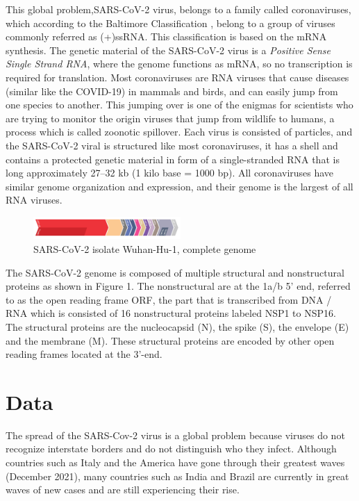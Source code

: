 \documentclass[conference,compsoc]{IEEEtran}
\begin{document}
This global problem,SARS-CoV-2 virus, belongs to a family called coronaviruses, which according to the Baltimore Classification \cite{ref5}, belong to a group of viruses commonly referred as (+)ssRNA. This classification is based on the mRNA synthesis. The genetic material of the SARS-CoV-2 virus is a \textit{Positive Sense Single Strand RNA}, where the genome functions as mRNA, so no transcription is required for translation. Most coronaviruses are RNA viruses that cause diseases (similar like the COVID-19) in mammals and birds, and can easily jump from one species to another. This jumping over is one of the enigmas for scientists who are trying to monitor the origin viruses that jump from wildlife to humans, a process which is called zoonotic spillover. \cite{ref6}
Each virus is consisted of particles, and the SARS-CoV-2 viral is structured like most coronaviruses, it has a shell and contains a protected genetic material in form of a  single-stranded RNA that is long approximately 27–32 kb (1 kilo base = 1000 bp). All coronaviruses have similar genome organization and expression, and their genome is the largest of all RNA viruses.

\begin{figure}[h]
    \centering
    \includegraphics[width=0.5\textwidth]{images/fig1-s_gene.jpg}
    \caption{SARS-CoV-2 isolate Wuhan-Hu-1, complete genome \cite{ref7}}
    \label{fig1}
\end{figure}

The SARS-CoV-2 genome is composed of multiple structural and nonstructural proteins as shown in Figure 1. The nonstructural are at the 1a/b 5' end, referred to as the open reading frame ORF, the part that is transcribed from DNA / RNA which is consisted of 16 nonstructural proteins labeled NSP1 to NSP16. The structural proteins are the nucleocapsid (N), the spike (S), the envelope (E) and the membrane (M). These structural proteins are encoded by other open reading frames located at the 3'-end. 


\section{Data}

The spread of the SARS-Cov-2 virus is a global problem because viruses do not recognize interstate borders and do not distinguish who they infect. Although countries such as Italy and the America have gone through their greatest waves (December 2021), many countries such as India \cite{ref8} and Brazil \cite{ref9} are currently in great waves of new cases and are still experiencing their rise. 
\end{document}
